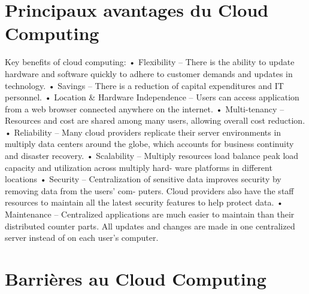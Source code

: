 \section{Principaux avantages du Cloud Computing}
Key benefits of cloud computing:
• Flexibility – There is the ability to update hardware and software quickly to adhere to customer demands and updates in technology.
• Savings – There is a reduction of capital expenditures and IT personnel.
• Location \& Hardware Independence – Users can access application from a web browser connected anywhere on the internet.
• Multi-tenancy – Resources and cost are shared among many users, allowing overall cost reduction.
• Reliability – Many cloud providers replicate their server environments in multiply data centers around the globe, which accounts for business continuity and disaster recovery.
• Scalability – Multiply resources load balance peak load capacity and utilization across multiply hard- ware platforms in different locations
• Security – Centralization of sensitive data improves security by removing data from the users’ com- puters. Cloud providers also have the staff resources to maintain all the latest security features to help protect data.
• Maintenance – Centralized applications are much easier to maintain than their distributed counter parts. All updates and changes are made in one centralized server instead of on each user’s computer.


\section{Barrières au Cloud Computing}

